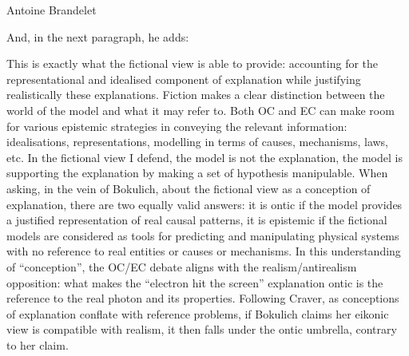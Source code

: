 \begin{artengenv}{Antoine Brandelet}

And, in the next paragraph, he adds:


This is exactly what the fictional view is able to provide: accounting for the representational and idealised component of explanation while justifying realistically these explanations. Fiction makes a clear distinction between the world of the model and what it may refer to. Both OC and EC can make room for various epistemic strategies in conveying the relevant information: idealisations, representations, modelling in terms of causes, mechanisms, laws, etc. In the fictional view I defend, the model is not the explanation, the model is supporting the explanation by making a set of hypothesis manipulable. When asking, in the vein of Bokulich, about the fictional view as a conception of explanation, there are two equally valid answers: it is ontic if the model provides a justified representation of real causal patterns, it is epistemic if the fictional models are considered as tools for predicting and manipulating physical systems with no reference to real entities or causes or mechanisms. In this understanding of ``conception'', the OC/EC debate aligns with the realism/antirealism opposition: what makes the ``electron hit the screen'' explanation ontic is the reference to the real photon and its properties. Following Craver, as conceptions of explanation conflate with reference problems, if Bokulich claims her eikonic view is compatible with realism, it then falls under the ontic umbrella, contrary to her claim.


\end{artengenv}
